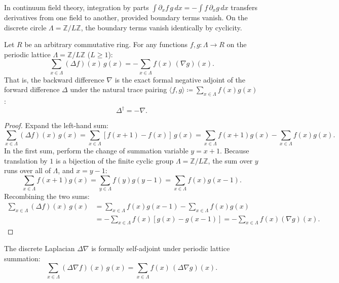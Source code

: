 In continuum field theory, integration by parts $\int \partial_x f \, g \, dx = - \int f \, \partial_x g \, dx$ transfers derivatives from one field to another, provided boundary terms vanish. On the discrete circle $\Lambda = \mathbb{Z}/L\mathbb{Z}$, the boundary terms vanish identically by cyclicity.

\begin{theorem}
\label{thm:summation_by_parts}
Let $R$ be an arbitrary commutative ring. For any functions $f, g : \Lambda \to R$ on the periodic lattice $\Lambda = \mathbb{Z}/L\mathbb{Z}$ ($L \ge 1$):
\begin{equation}
\sum_{x \in \Lambda} (\Delta f)(x)\, g(x) = - \sum_{x \in \Lambda} f(x)\, (\nabla g)(x).
\end{equation}
That is, the backward difference $\nabla$ is the exact formal negative adjoint of the forward difference $\Delta$ under the natural trace pairing $\langle f, g \rangle \coloneqq \sum_{x \in \Lambda} f(x) g(x)$:
\begin{equation}
\Delta^\dagger = - \nabla.
\end{equation}
\end{theorem}

\begin{proof}
Expand the left-hand sum:
\begin{equation}
\sum_{x \in \Lambda} (\Delta f)(x)\, g(x) = \sum_{x \in \Lambda} [f(x+1) - f(x)]\, g(x) = \sum_{x \in \Lambda} f(x+1) g(x) - \sum_{x \in \Lambda} f(x) g(x).
\end{equation}
In the first sum, perform the change of summation variable $y = x+1$. Because translation by $1$ is a bijection of the finite cyclic group $\Lambda = \mathbb{Z}/L\mathbb{Z}$, the sum over $y$ runs over all of $\Lambda$, and $x = y-1$:
\begin{equation}
\sum_{x \in \Lambda} f(x+1) g(x) = \sum_{y \in \Lambda} f(y) g(y-1) = \sum_{x \in \Lambda} f(x) g(x-1).
\end{equation}
Recombining the two sums:
\begin{align}
\sum_{x \in \Lambda} (\Delta f)(x)\, g(x) &= \sum_{x \in \Lambda} f(x) g(x-1) - \sum_{x \in \Lambda} f(x) g(x) \\
&= - \sum_{x \in \Lambda} f(x) [g(x) - g(x-1)] = - \sum_{x \in \Lambda} f(x) (\nabla g)(x).
\end{align}
\end{proof}

\begin{corollary}
The discrete Laplacian $\Delta\nabla$ is formally self-adjoint under periodic lattice summation:
\begin{equation}
\sum_{x \in \Lambda} (\Delta\nabla f)(x)\, g(x) = \sum_{x \in \Lambda} f(x)\, (\Delta\nabla g)(x).
\end{equation}
\end{corollary}

